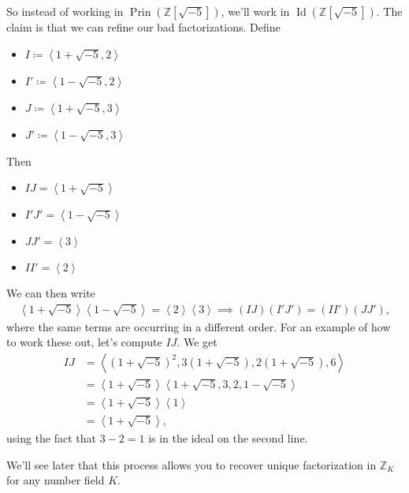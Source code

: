 \begin{remark}

So instead of working in
\(\mathop{\mathrm{Prin}}( {\mathbb{Z}}[\sqrt{-5} ])\), we'll work in
\(\operatorname{Id}({\mathbb{Z}}[\sqrt{-5} ])\). The claim is that we
can refine our bad factorizations. Define

\begin{itemize}
\tightlist
\item
  \(I\coloneqq\left\langle{ 1 + \sqrt{-5} , 2 }\right\rangle\)
\item
  \(I'\coloneqq\left\langle{ 1 - \sqrt{-5} , 2 }\right\rangle\)
\item
  \(J\coloneqq\left\langle{ 1 + \sqrt{-5} , 3 }\right\rangle\)
\item
  \(J'\coloneqq\left\langle{ 1 - \sqrt{-5} , 3 }\right\rangle\)
\end{itemize}

Then

\begin{itemize}
\tightlist
\item
  \(IJ = \left\langle{ 1 + \sqrt{-5} }\right\rangle\)\\
\item
  \(I'J' = \left\langle{ 1 - \sqrt{-5} }\right\rangle\)\\
\item
  \(JJ' = \left\langle{ 3 }\right\rangle\)
\item
  \(II' = \left\langle{ 2 }\right\rangle\)
\end{itemize}

We can then write
\begin{align*}
\left\langle{ 1 + \sqrt{-5} }\right\rangle \left\langle{ 1 - \sqrt{-5} }\right\rangle = \left\langle{ 2 }\right\rangle \left\langle{ 3 }\right\rangle \implies (IJ)(I'J') = (II')(JJ')    
,\end{align*}
where the same terms are occurring in a different order. For an example
of how to work these out, let's compute \(IJ\). We get
\begin{align*}
IJ 
&= \left\langle{ (1 + \sqrt{-5} )^2, 3(1 + \sqrt{-5} ), 2(1 + \sqrt{-5} ), 6 }\right\rangle  \\
&= \left\langle{ 1 + \sqrt{-5} }\right\rangle \left\langle{ 1 + \sqrt{-5} , 3, 2, 1 - \sqrt{-5} }\right\rangle \\  
&= \left\langle{ 1 + \sqrt{-5} }\right\rangle \left\langle{ 1 }\right\rangle  \\
&= \left\langle{ 1 + \sqrt{-5} }\right\rangle
,\end{align*}
using the fact that \(3-2=1\) is in the ideal on the second line.

\hfill\break

We'll see later that this process allows you to recover unique
factorization in \({\mathbb{Z}}_K\) for any number field \(K\).

\end{remark}

